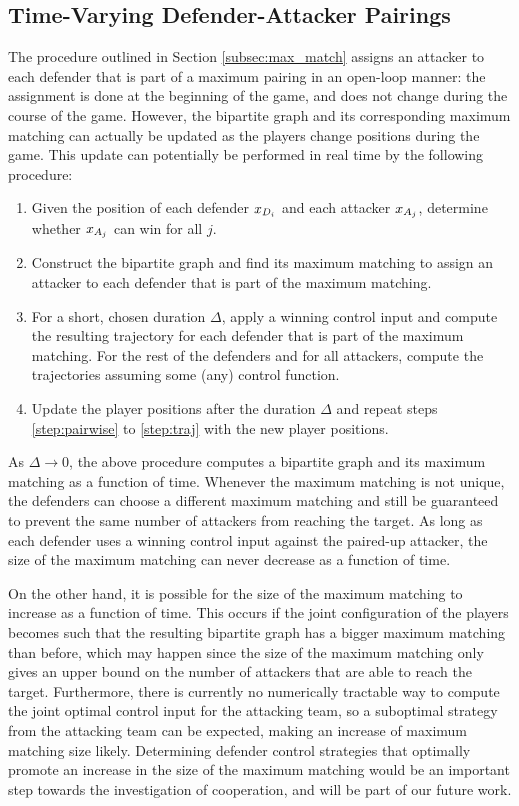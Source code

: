 \subsection{Time-Varying Defender-Attacker Pairings}
\label{subsec:tvarp}
The procedure outlined in Section \ref{subsec:max_match} assigns an attacker to each defender that is part of a maximum pairing in an open-loop manner: the assignment is done at the beginning of the game, and does not change during the course of the game. However, the bipartite graph and its corresponding maximum matching can actually be updated as the players change positions during the game. This update can potentially be performed in real time by the following procedure:

\begin{enumerate}
\item Given the position of each defender $x_{D_{i}}$ and each attacker $x_{A_{j}}$, determine whether $x_{A_{j}}$ can win for all $j$. \label{step:pairwise}
\item Construct the bipartite graph and find its maximum matching to assign an attacker to each defender that is part of the maximum matching.
\item For a short, chosen duration $\Delta$, apply a winning control input and compute the resulting trajectory for each defender that is part of the maximum matching. For the rest of the defenders and for all attackers, compute the trajectories assuming some (any) control function. \label{step:traj}
\item Update the player positions after the duration $\Delta$ and repeat steps \ref{step:pairwise} to \ref{step:traj}  with the new player positions.
\end{enumerate}

As $\Delta\rightarrow 0$, the above procedure computes a bipartite graph and its maximum matching as a function of time. Whenever the maximum matching is not unique, the defenders can choose a different maximum matching and still be guaranteed to prevent the same number of attackers from reaching the target. As long as each defender uses a winning control input against the paired-up attacker, the size of the maximum matching can never decrease as a function of time. 

On the other hand, it is possible for the size of the maximum matching to increase as a function of time. This occurs if the joint configuration of the players becomes such that the resulting bipartite graph has a bigger maximum matching than before, which may happen since the size of the maximum matching only gives an upper bound on the number of attackers that are able to reach the target. Furthermore, there is currently no numerically tractable way to compute the joint optimal control input for the attacking team, so a suboptimal strategy from the attacking team can be expected, making an increase of maximum matching size likely. Determining defender control strategies that optimally promote an increase in the size of the maximum matching would be an important step towards the investigation of cooperation, and will be part of our future work.